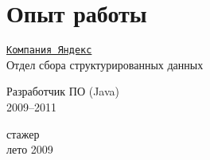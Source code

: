 \section{Опыт работы}
\href{http://company.yandex.com/}{\tt Компания Яндекс} \\
Отдел сбора структурированных данных
\begin{innerlist}
\item Разработчик ПО (Java)\\
  2009--2011
\item стажер\\
  лето 2009
\end{innerlist}

